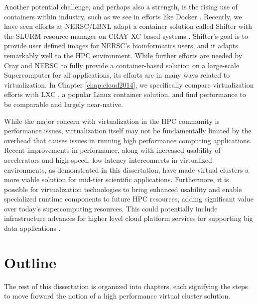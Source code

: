 Another potential challenge, and perhaps also a strength, is the rising use of containers within industry, such as we see in efforts like Docker \cite{merkel2014docker}. Recently, we have seen efforts at NERSC/LBNL adapt a container solution called Shifter with the SLURM resource manager on CRAY XC based systems \cite{jacobsen2015contain}. Shifter's goal is to provide user defined images for NERSC's bioinformatics users, and it adapts remarkably well to the HPC environment. While further efforts are needed by Cray and NERSC to fully provide a container-based solution on a large-scale Supercomputer for all applications, its efforts are in many ways related to virtualization. In Chapter \ref{chap:cloud2014}, we specifically compare virtualization efforts with LXC \cite{xavier2013performance}, a popular Linux container solution, and find performance to be comparable and largely near-native. 

 
While the major concern with virtualization in the HPC community is performance issues, virtualization itself may not be fundamentally limited by the overhead that causes issues in running high performance computing applications. Recent improvements in performance, along with increased usability of accelerators and high speed, low latency interconnects in virtualized environments, as demonstrated in this dissertation, have made virtual clusters a more viable solution for mid-tier scientific applications.  Furthermore, it is possible for  virtualization technologies to bring enhanced usability and enable specialized runtime components to future HPC resources, adding significant value over today's supercomputing resources.  This could potentially include infrastructure advances for higher level cloud platform services for supporting big data applications \cite{qiu2014towards}. 







\section{Outline}
\label{sec:outline}


The rest of this dissertation is organized into chapters, each signifying the steps to move forward the notion of a high performance virtual cluster solution.

